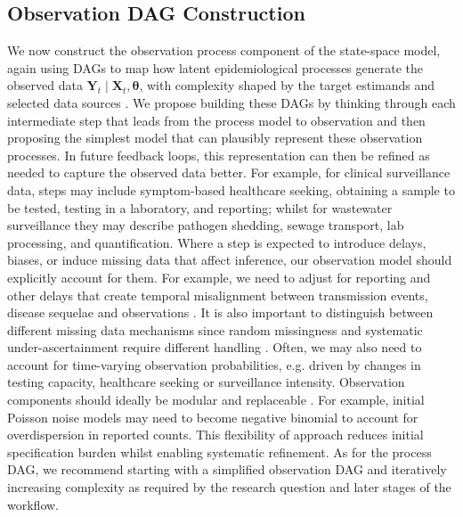 \documentclass{article}
\begin{document}
\subsection{Observation DAG Construction} \label{sec:observation}

We now construct the observation process component of the state-space model, again using \ac{DAG}s to map how latent epidemiological processes generate the observed data $\boldsymbol{Y}_t \mid \boldsymbol{X}_t, \boldsymbol{\theta}$, with complexity shaped by the target estimands and selected data sources \citep{deangelis2018analysing,birrell2018evidence}.
We propose building these \ac{DAG}s by thinking through each intermediate step that leads from the process model to observation and then proposing the simplest model that can plausibly represent these observation processes.
In future feedback loops, this representation can then be refined as needed to capture the observed data better.
For example, for clinical surveillance data, steps may include symptom-based healthcare seeking, obtaining a sample to be tested, testing in a laboratory, and reporting; whilst for wastewater surveillance they may describe pathogen shedding, sewage transport, lab processing, and quantification.
Where a step is expected to introduce delays, biases, or induce missing data that affect inference, our observation model should explicitly account for them. For example, we need to adjust for reporting and other delays that create temporal misalignment between transmission events, disease sequelae and observations  \citep{seaman2022nowcasting}. It is also important to distinguish between different missing data mechanisms since random missingness and systematic under-ascertainment require different handling \citep{sherratt2021exploring}. Often, we may  also need to account for time-varying observation probabilities, e.g. driven by changes in testing capacity, healthcare seeking or surveillance intensity. Observation components should ideally be modular and replaceable  \citep{gelman2020bayesian}. For example, initial Poisson noise models may need to become negative binomial to account for overdispersion in reported counts. This flexibility of approach reduces initial specification burden whilst enabling systematic refinement.
As for the process \ac{DAG}, we recommend starting with a simplified observation DAG and iteratively increasing complexity as required by the research question and later stages of the workflow.
\end{document}
